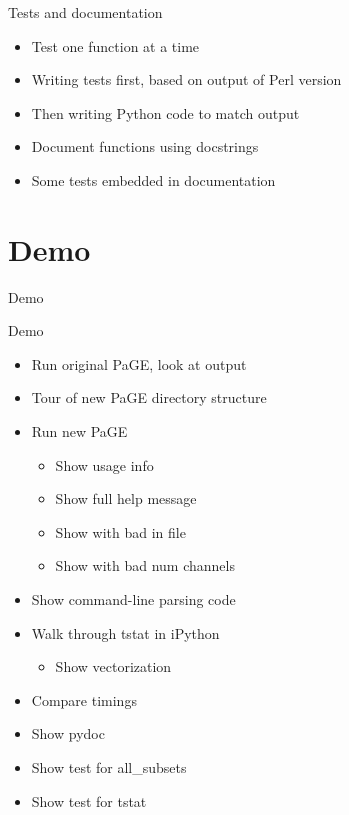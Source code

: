 \documentclass{beamer}
\begin{document}
\begin{frame}{Tests and documentation}
  \begin{itemize}
  \item Test one function at a time
  \item Writing tests first, based on output of Perl version
  \item Then writing Python code to match output
  \item Document functions using docstrings
  \item Some tests embedded in documentation
  \end{itemize}  
\end{frame}

\section{Demo}
\begin{frame}
  \begin{centering}
    \Large{Demo}        
  \end{centering}
\end{frame}

\begin{frame}{Demo}
  \begin{itemize}
  \item Run original PaGE, look at output
  \item Tour of new PaGE directory structure

  \item Run new PaGE
    \begin{itemize}
    \item Show usage info
    \item Show full help message
    \item Show with bad in file
    \item Show with bad num channels
    \end{itemize}

  \item Show command-line parsing code

  \item Walk through tstat in iPython
    \begin{itemize}
    \item Show vectorization
    \end{itemize}

  \item Compare timings

  \item Show pydoc

  \item Show test for all\_subsets
  \item Show test for tstat
  \end{itemize}
\end{frame}
\end{document}

